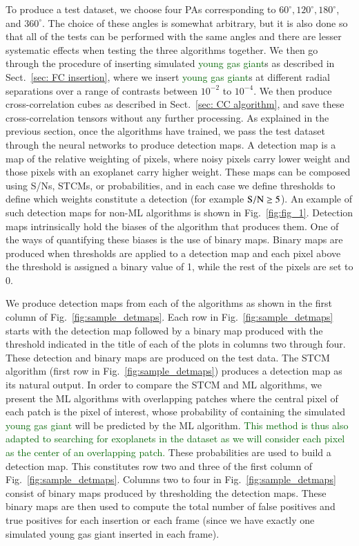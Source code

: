 \documentclass[referee]{aa} %
\newcommand{\newchange}[1]{\textcolor{darkgreen}{#1}}
\begin{document}
To produce a test dataset, we choose four PAs corresponding to $60^{\circ},120^{\circ},180^{\circ}$, and $360^{\circ}$.
The choice of these angles is somewhat arbitrary, but it is also done so that all of the tests can be performed with the same angles and there are lesser systematic effects when testing the three algorithms together.
We then go through the procedure of inserting simulated \newchange{young gas giant}s as described in Sect.~\ref{sec: FC insertion}, where we insert \newchange{young gas giant}s at different radial separations over a range of contrasts between $10^{-2}$ to $10^{-4}$. We then produce cross-correlation cubes as described in Sect.~\ref{sec: CC algorithm}, and save these cross-correlation tensors without any further processing. As explained in the previous section, once the algorithms have trained, we pass the test dataset through the neural networks to produce detection maps.
A detection map is a map of the relative weighting of pixels, where noisy pixels carry lower weight and those pixels with an exoplanet carry higher weight.
These maps can be composed using S/Ns, STCMs, or probabilities, and in each case we define thresholds to define which weights constitute a detection (for example $\rm{S/N}\ge 5$).
An example of such detection maps for non-ML algorithms is shown in Fig.~\ref{fig:fig_1}.
Detection maps intrinsically hold the biases of the algorithm that produces them. %
One of the ways of quantifying these biases is the use of  binary maps.
Binary maps are produced when thresholds are applied to a detection map and each pixel above the threshold is assigned a binary value of 1, while the rest of the pixels are set to 0.

We produce detection maps from each of the algorithms as shown in the first column of Fig.~\ref{fig:sample_detmaps}.
Each row in Fig.~\ref{fig:sample_detmaps} starts with the detection map followed by a binary map produced with the threshold indicated in the title of each of the plots in columns two through four.
These detection and binary maps are produced on the test data.
The STCM algorithm (first row in Fig.~\ref{fig:sample_detmaps}) produces a detection map as its natural output.
In order to compare the STCM and ML algorithms, we present the ML algorithms with overlapping patches where the central pixel of each patch is the pixel of interest, whose probability of containing the simulated \newchange{young gas giant} will be predicted by the ML algorithm.
\newchange{This method is thus also adapted to searching for exoplanets in the dataset as we will consider each pixel as the center of an overlapping patch.}
These probabilities are used to build a detection map.
This constitutes row two and three of the first column of Fig.~\ref{fig:sample_detmaps}.
Columns two to four in Fig.~\ref{fig:sample_detmaps} consist of binary maps produced by thresholding the detection maps.
These binary maps are then used to compute the total number of false positives and true positives for each insertion or each frame (since we have exactly one simulated young gas giant inserted in each frame).
\end{document}
